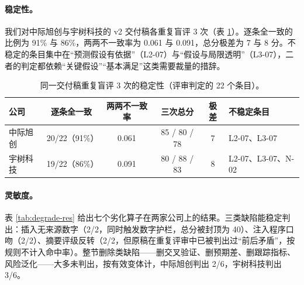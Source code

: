 \paragraph{稳定性。}我们对中际旭创与宇树科技的 v2 交付稿各重复盲评 3 次（表 \ref{tab:stability}）。逐条全一致的比例为 91\% 与 86\%，两两不一致率为 0.061 与 0.091，总分极差为 7 与 8 分。不稳定的条目集中在“预测假设有依据”（L2-07）与“假设与局限透明”（L3-07），二者的判定都依赖“关键假设”“基本满足”这类需要裁量的措辞。

\begin{table}[h]
\centering
\caption{同一交付稿重复盲评 3 次的稳定性（评审判定的 22 个条目）。}
\label{tab:stability}
\small
\begin{tabular}{@{}lcccc l@{}}
\toprule
公司 & 逐条全一致 & 两两不一致率 & 三次总分 & 极差 & 不稳定条目 \\
\midrule
中际旭创 & 20/22（91\%） & 0.061 & 85 / 80 / 78 & 7 & L2-07、L3-07 \\
宇树科技 & 19/22（86\%） & 0.091 & 80 / 88 / 83 & 8 & L2-07、L3-07、N-02 \\
\bottomrule
\end{tabular}
\end{table}

\paragraph{灵敏度。}表 \ref{tab:degrade-res} 给出七个劣化算子在两家公司上的结果。三类缺陷能稳定判出：插入无来源数字（2/2，同时触发数字护栏，总分被封顶为 40）、注入程序口吻（2/2）、摘要评级反转（2/2，但原稿在重复评审中已被判出过“前后矛盾”，按规则不计入命中率）。整节删除类缺陷——删交叉验证、删预期差、删跟踪指标、风险泛化——大多未判出，按有效变体计，中际旭创判出 2/6，宇树科技判出 3/6。

